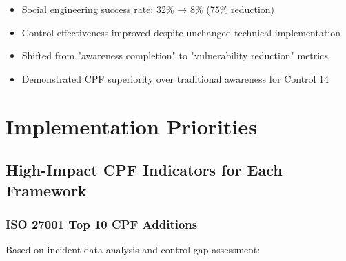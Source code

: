 \documentclass[11pt,a4paper]{article}
\begin{document}
\begin{itemize}
\item Social engineering success rate: 32\% → 8\% (75\% reduction)
\item Control effectiveness improved despite unchanged technical implementation
\item Shifted from "awareness completion" to "vulnerability reduction" metrics
\item Demonstrated CPF superiority over traditional awareness for Control 14
\end{itemize}

\section{Implementation Priorities}

\subsection{High-Impact CPF Indicators for Each Framework}

\subsubsection{ISO 27001 Top 10 CPF Additions}

Based on incident data analysis and control gap assessment:
\end{document}

